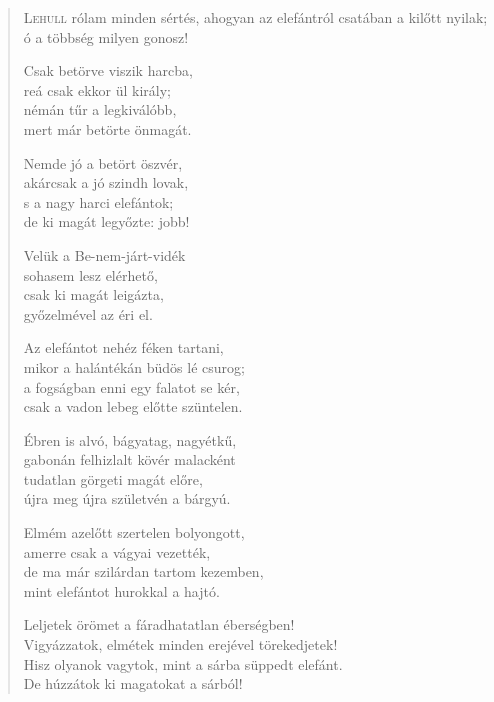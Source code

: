 
\begin{verse}

{\par%
\lettrine{L}{ehull} {\LettrineTextFont rólam minden sértés,}\newline
ahogyan az elefántról\newline
csatában a kilőtt nyilak;\verselinebreak
ó a többség milyen gonosz!
\par}

 Csak betörve viszik harcba,\\
reá csak ekkor ül király;\\
némán tűr a legkiválóbb,\\
mert már betörte önmagát.

 Nemde jó a betört öszvér,\\
akárcsak a jó szindh lovak,\\
s a nagy harci elefántok;\\
de ki magát legyőzte: jobb!

 Velük a Be-nem-járt-vidék\\
sohasem lesz elérhető,\\
csak ki magát leigázta,\\
győzelmével az éri el.

 Az elefántot nehéz féken tartani,\\
mikor a halántékán büdös lé csurog;\\
a fogságban enni egy falatot se kér,\\
csak a vadon lebeg előtte szüntelen.

 Ébren is alvó, bágyatag, nagyétkű,\\
gabonán felhizlalt kövér malacként\\
tudatlan görgeti magát előre,\\
újra meg újra születvén a bárgyú.

 Elmém azelőtt szertelen bolyongott,\\
amerre csak a vágyai vezették,\\
de ma már szilárdan tartom kezemben,\\
mint elefántot hurokkal a hajtó.

 Leljetek örömet a fáradhatatlan éberségben!\\
Vigyázzatok, elmétek minden erejével törekedjetek!\\
Hisz olyanok vagytok, mint a sárba süppedt elefánt.\\
De húzzátok ki magatokat a sárból!


\end{verse}
